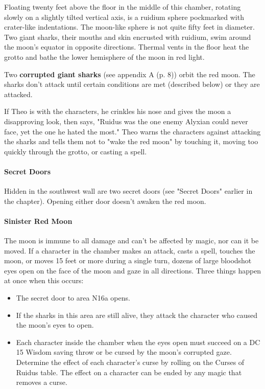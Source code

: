 \documentclass[letterpaper, 11pt, bg=full, twocolumn]{dndbook}
\begin{document}
\begin{DndReadAloud}
Floating twenty feet above the floor in the middle of this chamber, rotating slowly on a slightly tilted vertical axis, is a ruidium sphere pockmarked with crater-like indentations. The moon-like sphere is not quite fifty feet in diameter. Two giant sharks, their mouths and skin encrusted with ruidium, swim around the moon's equator in opposite directions. Thermal vents in the floor heat the grotto and bathe the lower hemisphere of the moon in red light.
\end{DndReadAloud}

Two \textbf{corrupted giant sharks} (see appendix A (p. 8)) orbit the red moon. The sharks don't attack until certain conditions are met (described below) or they are attacked.

If Theo is with the characters, he crinkles his nose and gives the moon a disapproving look, then says, "Ruidus was the one enemy Alyxian could never face, yet the one he hated the most." Theo warns the characters against attacking the sharks and tells them not to "wake the red moon" by touching it, moving too quickly through the grotto, or casting a spell.

\paragraph{Secret Doors}

Hidden in the southwest wall are two secret doors (see "Secret Doors" earlier in the chapter). Opening either door doesn't awaken the red moon.

\paragraph{Sinister Red Moon}

The moon is immune to all damage and can't be affected by magic, nor can it be moved. If a character in the chamber makes an attack, casts a spell, touches the moon, or moves 15 feet or more during a single turn, dozens of large bloodshot eyes open on the face of the moon and gaze in all directions. Three things happen at once when this occurs:

\begin{itemize}
\item The secret door to area N16a opens.
\item If the sharks in this area are still alive, they attack the character who caused the moon's eyes to open.
\item Each character inside the chamber when the eyes open must succeed on a DC 15 Wisdom saving throw or be cursed by the moon's corrupted gaze. Determine the effect of each character's curse by rolling on the Curses of Ruidus table. The effect on a character can be ended by any magic that removes a curse.
\end{itemize}
\end{document}
